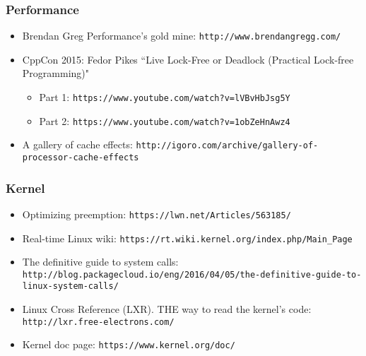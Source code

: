 \begin{frame}[fragile]
  \frametitle{Performance}

  \begin{itemize}
  \item Brendan Greg Performance's gold mine: \verb+http://www.brendangregg.com/+
  \item CppCon 2015: Fedor Pikes “Live Lock-Free or Deadlock (Practical Lock-free Programming)"
    \begin{itemize}
    \item Part 1: \verb+https://www.youtube.com/watch?v=lVBvHbJsg5Y+
    \item Part 2: \verb+https://www.youtube.com/watch?v=1obZeHnAwz4+
    \end{itemize}
  \item A gallery of cache effects: \footnotesize\verb+http://igoro.com/archive/gallery-of-processor-cache-effects+
  \end{itemize}
\end{frame}

\begin{frame}[fragile]
  \frametitle{Kernel}

  \begin{itemize}
  \item Optimizing preemption: \verb+https://lwn.net/Articles/563185/+
  \item Real-time Linux wiki: \verb+https://rt.wiki.kernel.org/index.php/Main_Page+
  \item The definitive guide to system calls: \tiny\verb+http://blog.packagecloud.io/eng/2016/04/05/the-definitive-guide-to-linux-system-calls/+
  \item \small Linux Cross Reference (LXR). THE way to read the kernel's code: \verb+http://lxr.free-electrons.com/+
  \item Kernel doc page: \verb+https://www.kernel.org/doc/+
  \end{itemize}
\end{frame}
